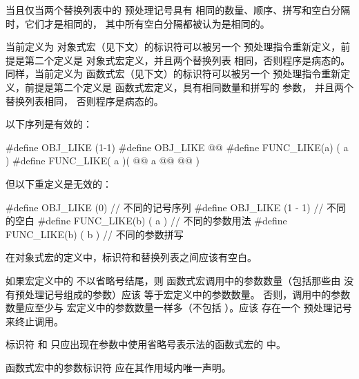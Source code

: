     \pnum
    当且仅当两个替换列表中的
    预处理记号具有
    相同的数量、顺序、拼写和空白分隔时，它们才是相同的，
    其中所有空白分隔都被认为是相同的。
    
    \pnum
    当前定义为
    对象式宏（见下文）的标识符可以被另一个
    预处理指令重新定义，前提是第二个定义是
    对象式宏定义，并且两个替换列表
    相同，否则程序是病态的。
    同样，当前定义为
    函数式宏（见下文）的标识符可以被另一个
    预处理指令重新定义，前提是第二个定义是
    函数式宏定义，具有相同数量和拼写的
    参数，
    并且两个替换列表相同，
    否则程序是病态的。
    

    \pnum
    \begin{example}
    以下序列是有效的：
    \begin{codeblock}
    #define OBJ_LIKE      (1-1)
    #define OBJ_LIKE      @@
    #define FUNC_LIKE(a)   ( a )
    #define FUNC_LIKE( a )(     @@
                    a @@
                      @\tcode{*/}@ )
    \end{codeblock}
    但以下重定义是无效的：
    \begin{codeblock}
    #define OBJ_LIKE    (0)         // 不同的记号序列
    #define OBJ_LIKE    (1 - 1)     // 不同的空白
    #define FUNC_LIKE(b) ( a )      // 不同的参数用法
    #define FUNC_LIKE(b) ( b )      // 不同的参数拼写
    \end{codeblock}
    \end{example}
    
    \pnum
    在对象式宏的定义中，标识符和替换列表之间应该有空白。
    
    \pnum
    如果宏定义中的  不以省略号结尾，则
    函数式宏调用中的参数数量（包括那些由
    没有预处理记号组成的参数）应该
    等于宏定义中的参数数量。
    否则，调用中的参数数量应至少与
    宏定义中的参数数量一样多（不包括 ）。应该
    存在一个
    \tcode{)}
    预处理记号来终止调用。
    
    \pnum
    标识符  和 
    只应出现在参数中使用省略号表示法的函数式宏的  中。
    
    \pnum
    函数式宏中的参数标识符
    应在其作用域内唯一声明。
    
